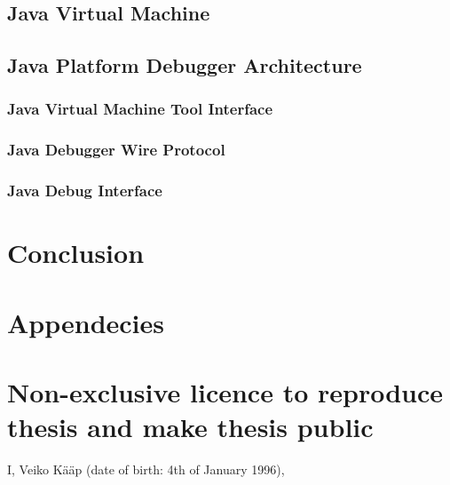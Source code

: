 \documentclass{style/bachelor-thesis}
\begin{document}
\subsection{Java Virtual Machine}
\label{sec:jvm}


\subsection{Java Platform Debugger Architecture}
\label{sec:jpda}


\subsubsection{Java Virtual Machine Tool Interface}
\label{sec:jvmti}


\subsubsection{Java Debugger Wire Protocol}
\label{sec:jdwp}


\subsubsection{Java Debug Interface}
\label{sec:jdi}


\clearpage
\section{Conclusion} 



\newpage

{}


\newpage

\appendix
\section*{Appendecies}
\renewcommand{\thesubsection}{\Alph{subsection}}

\pagebreak
\section*{\small Non-exclusive licence to reproduce thesis and make thesis public}


I, Veiko Kääp (date of birth: 4th of January 1996),
\end{document}
